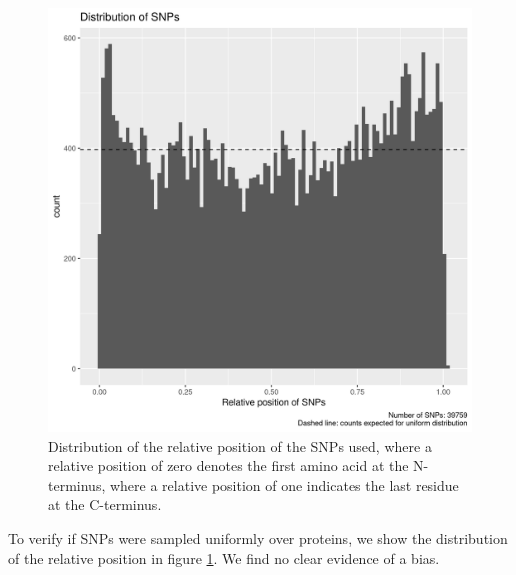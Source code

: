 \begin{figure}[!htbp]
  \includegraphics[width=\textwidth]{ncbi_peregrine_results/fig_snp_rel_pos.png}
  \caption{
    Distribution of the relative position of the SNPs used,
    where a relative position of zero denotes the first amino
    acid at the N-terminus, where a relative position of one
    indicates the last residue at the C-terminus.
  }
  \label{fig:snp_rel_pos}
\end{figure}


To verify if SNPs were sampled uniformly
over proteins, we show the distribution 
of the relative position in figure \ref{fig:snp_rel_pos}.
We find no clear evidence of a bias.

%
%





